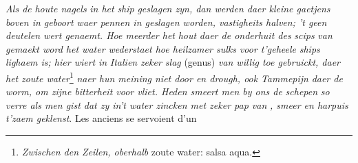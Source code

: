  \pstart \textit{ Als de }\textit{houte nagels}\protect{}\textit{ in het }\textit{ship}\protect{}\textit{ geslagen zyn, dan werden daer kleine gaetjens boven in geboort waer pennen in geslagen worden, vastigheits halven; 't geen deutelen wert genaemt. Hoe meerder het }\textit{hout}\protect{}\textit{ daer de onderhuit des }\textit{scips}\protect{}\textit{ van gemaekt word het water wederstaet hoe heilzamer sulks voor t'geheele }\textit{ships}\protect{}\textit{ lighaem is; hier wiert }\textit{ in }\textit{Italien}\protect{}\textit{ zeker slag} (genus) \textit{van willig toe gebruickt, daer het }\textit{zoute water}\protect{}\footnote{\textit{Zwischen den Zeilen, oberhalb} zoute water: salsa aqua.}\textit{ naer hun meining niet door en drough, ook }\textit{Tammepijn}\protect{}\textit{ daer de worm, om zijne bitterheit voor vliet. Heden smeert men by ons de }\textit{schepen}\protect{}\textit{ so verre als men gist dat zy in't water zincken met zeker pap van }\textit{, smeer en harpuis t'zaem geklenst}. Les anciens se servoient d'un 